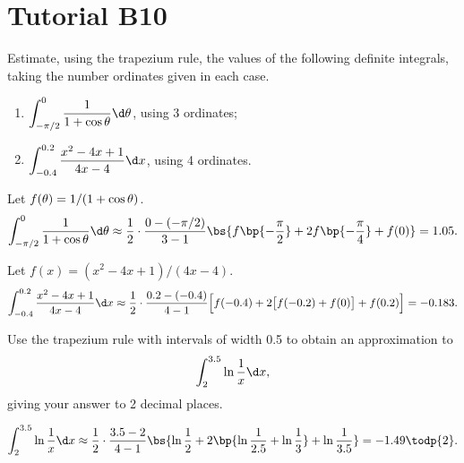 \section{Tutorial B10}

\begin{problem}
    Estimate, using the trapezium rule, the values of the following definite integrals, taking the number ordinates given in each case.

    \begin{enumerate}
        \item $\displaystyle\int_{-\pi/2}^0 \frac1{1 + \cos\t} \d \t$, using 3 ordinates;
        \item $\displaystyle\int_{-0.4}^{0.2} \frac{x^2 - 4x + 1}{4x - 4} \d x$, using 4 ordinates.
    \end{enumerate}
\end{problem}
\begin{solution}
    \begin{ppart}
        Let $f(\theta) = 1/(1 + \cos\theta)$. \[\int_{-\pi/2}^0 \frac1{1 + \cos\t} \d \t \approx \frac12 \cdot \frac{0 - (-\pi/2)}{3-1} \bs{f\bp{-\frac\pi2} + 2f\bp{-\frac\pi4} + f(0)} = 1.05.\]
    \end{ppart}
    \begin{ppart}
        Let $f(x) = (x^2 - 4x + 1)/(4x - 4)$. \[\int_{-0.4}^{0.2} \frac{x^2 - 4x + 1}{4x - 4} \d x \approx \frac12 \cdot \frac{0.2 - (-0.4)}{4 - 1} \Big[f(-0.4) + 2\big[f(-0.2) + f(0)\big] + f(0.2)\Big] = -0.183.\]
    \end{ppart}
\end{solution}

\begin{problem}
    Use the trapezium rule with intervals of width 0.5 to obtain an approximation to \[\int_2^{3.5} \ln \frac1x \d x,\] giving your answer to 2 decimal places.
\end{problem}
\begin{solution}
    \begin{align*}
        \int_2^{3.5} \ln \frac1x \d x \approx \frac12 \cdot \frac{3.5 - 2}{4 - 1} \bs{\ln \frac12 + 2\bp{\ln \frac1{2.5} + \ln \frac13} + \ln \frac1{3.5}} = -1.49 \todp{2}.
    \end{align*}
\end{solution}

